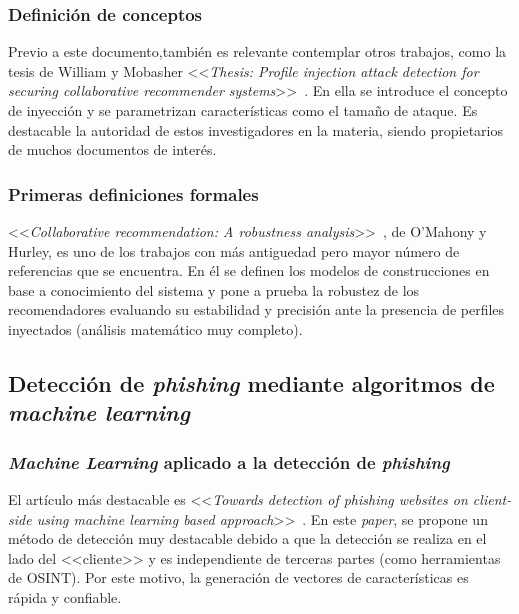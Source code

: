 \subsubsection{Definición de conceptos~\cite{Mobasher2006Thesis}}
Previo a este documento,también es relevante contemplar otros trabajos, como la tesis de William y Mobasher <<\textit{Thesis: Profile injection attack detection for securing collaborative recommender systems}>>~\cite{Mobasher2006Thesis}. En ella se introduce el concepto de inyección y se parametrizan características como el tamaño de ataque. Es destacable la autoridad de estos investigadores en la materia, siendo propietarios de muchos documentos de interés.

\subsubsection{Primeras definiciones formales~\cite{mahony2004CollaborativeRecommendation}}
<<\textit{Collaborative recommendation: A robustness analysis}>>~\cite{mahony2004CollaborativeRecommendation}, de O'Mahony y Hurley, es uno de los trabajos con más antiguedad pero mayor número de referencias que se encuentra. En él se definen los modelos de construcciones en base a conocimiento del sistema y pone a prueba la robustez de los recomendadores evaluando su estabilidad y precisión ante la presencia de perfiles inyectados (análisis matemático muy completo).

\subsection{Detección de \textit{phishing} mediante algoritmos de \textit{machine learning}}

\subsubsection{\textit{Machine Learning} aplicado a la detección de \textit{phishing}}
El artículo más destacable es <<\textit{Towards detection of phishing websites on client-side using machine learning based approach}>>~\cite{featuresPhishing2018Gupta}. En este \textit{paper}, se propone un método de detección muy destacable debido a que la detección se realiza en el lado del <<cliente>> y es independiente de terceras partes (como herramientas de OSINT). Por este motivo, la generación de vectores de características es rápida y confiable.